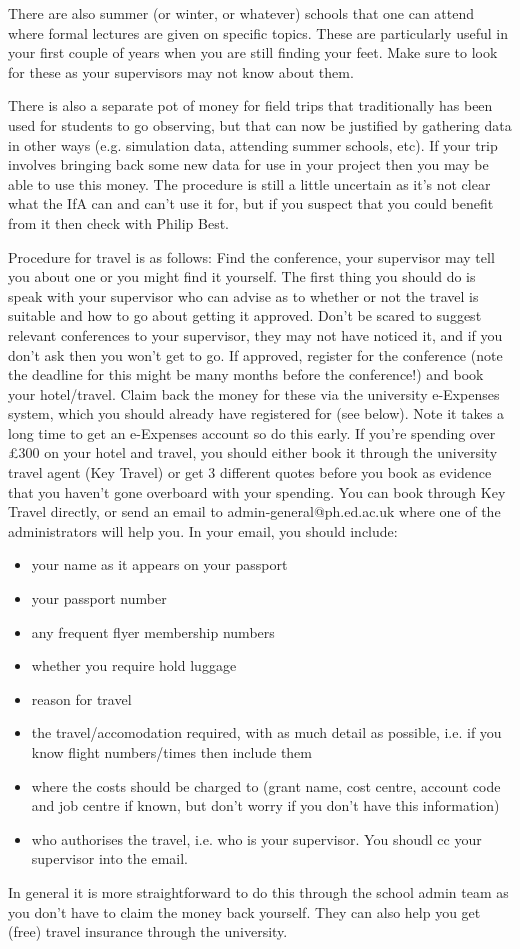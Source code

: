 There are also summer (or winter, or whatever) schools that one can attend
where formal lectures are given on specific topics. These are particularly
useful in your first couple of years when you are still finding your feet.
Make sure to look for these as your supervisors may not know about them.

There is also a separate pot of money for field trips that traditionally has been used for students to go observing, but that can now be justified by gathering data in other ways (e.g. simulation data, attending summer schools, etc). If your trip involves bringing back some new data for use in your project then you may be able to use this money. The procedure is still a little uncertain as it's not clear what the IfA can and can't use it for, but if you suspect that you could benefit from it then check with Philip Best.

Procedure for travel is as follows:
Find the conference, your supervisor may tell you about one or you
might find it yourself. The first thing you should do is speak with your supervisor who can advise as to whether or not the travel is suitable and how to go about getting it approved. Don't be scared to suggest relevant conferences to your supervisor, they may not have noticed it, and if you don't ask then you won't get to go.  If approved, register for the conference (note the deadline for this might be many months before the conference!) and
book your hotel/travel. Claim back the money for these via the university e-Expenses system,
which you should already have registered for (see below).  Note it takes a long
time to get an e-Expenses account so do this early. If you're spending over \pounds300 on your hotel and travel, you should either book it through the university travel agent (Key Travel) or get 3 different quotes before you book as evidence that you haven't gone overboard with your spending. You can book through Key Travel directly, or send an email to admin-general@ph.ed.ac.uk where one of the administrators will help you. In your email, you should include:
\begin{itemize}
    \item your name as it appears on your passport
    \item your passport number
    \item any frequent flyer membership numbers
    \item whether you require hold luggage
    \item reason for travel
    \item the travel/accomodation required, with as much detail as possible, i.e. if you know flight numbers/times then include them
    \item where the costs should be charged to (grant name, cost centre, account code and job centre if known, but don't worry if you don't have this information)
    \item who authorises the travel, i.e. who is your supervisor. You shoudl cc your supervisor into the email.
\end{itemize}
In general it is more straightforward to do this through the school admin team as you don't have to claim the money back yourself. They can also help you get (free) travel insurance through the university.

